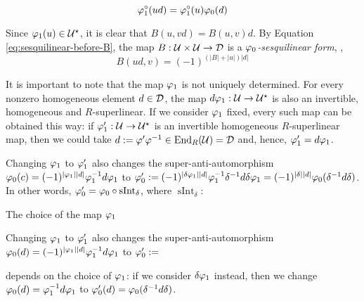 \documentclass{amsbook}
\begin{document}
\begin{equation}\label{eq:sesquilinear-with-vphi1-circ}
    \varphi_1^\circ (ud) = \varphi_1^\circ (u) \varphi_0 (d)
\end{equation}

Since $\varphi_1(u) \in \mathcal U^\star$, it is clear that $B(u,vd) = B(u,v)d$. By Equation \eqref{eq:sesquilinear-before-B}, the map $B: \mathcal U \times \mathcal U \to \mathcal{D}$ is a \emph{$\varphi_0$-sesquilinear form}, \ie,
\[
    B(ud, v) = (-1)^ {(|B| + |u|)|d|}
\]



It is important to note that the map $\varphi_1$ is not uniquely determined. For every nonzero homogeneous element $d\in\mathcal{D}$, the map $d\varphi_1: \mathcal U \to \mathcal U^\star$ is also an invertible, homogeneous and $R$-superlinear. If we consider $\varphi_1$ fixed, every such map can be obtained this way: if $\varphi_1' : \mathcal U \to \mathcal U^\star$ is an invertible homogeneous $R$-superlinear map, then we could take $d := \varphi'\varphi^{-1} \in \operatorname{End}_R(\mathcal U) = \mathcal{D}$ and, hence, $\varphi_1' = d \varphi_1$.

Changing $\varphi_1$ to $\varphi_1'$ also changes the super-anti-automorphism $\varphi_0 (c) = (-1)^{|\varphi_1||d|}\varphi_1^{-1} d \varphi_1$ to $\varphi_0':= (-1)^{|\delta\varphi_1||d|}\varphi_1^{-1}\delta^{-1} d \delta\varphi_1= (-1)^{|\delta||d|} \varphi_0(\delta^{-1} d \delta)$. In other words, $\varphi_0' = \varphi_0 \circ \operatorname{sInt}_\delta$, where $\operatorname{sInt}_\delta: $

The choice of the map $\varphi_1$ 

Changing $\varphi_1$ to $\varphi_1'$ also changes the super-anti-automorphism $\varphi_0(d) = (-1)^{|\varphi_1||d|}\varphi_1^{-1} d \varphi_1$ to $\varphi_0':= $


depends on the choice of $\varphi_1$: if we consider $\delta\varphi_1$ instead, then we change $\varphi_0(d) = \varphi_1^{-1} d \varphi_1$ to $\varphi_0'(d) = \varphi_0(\delta^{-1} d \delta)$.
\end{document}
